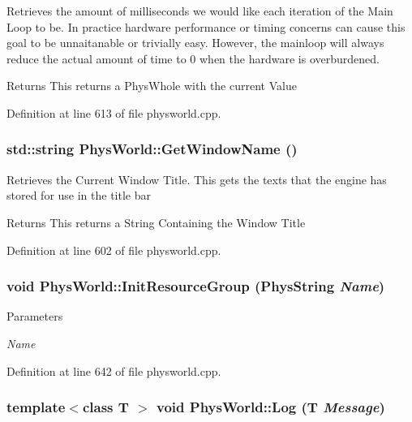 Retrieves the amount of milliseconds we would like each iteration of the Main Loop to be. In practice hardware performance or timing concerns can cause this goal to be unnaitanable or trivially easy. However, the mainloop will always reduce the actual amount of time to 0 when the hardware is overburdened. \begin{DoxyReturn}{Returns}
This returns a PhysWhole with the current Value 
\end{DoxyReturn}


Definition at line 613 of file physworld.cpp.\hypertarget{classPhysWorld_a09163480a549b39a945ee97415eabdc0}{
\subsubsection[{GetWindowName}]{\setlength{\rightskip}{0pt plus 5cm}std::string PhysWorld::GetWindowName ()}}
\label{db/df5/classPhysWorld_a09163480a549b39a945ee97415eabdc0}


Retrieves the Current Window Title. This gets the texts that the engine has stored for use in the title bar \begin{DoxyReturn}{Returns}
This returns a String Containing the Window Title 
\end{DoxyReturn}


Definition at line 602 of file physworld.cpp.\hypertarget{classPhysWorld_a0b67df4c76c32b9b2bdcafdc51f6aba7}{
\subsubsection[{InitResourceGroup}]{\setlength{\rightskip}{0pt plus 5cm}void PhysWorld::InitResourceGroup (PhysString {\em Name})}}
\label{db/df5/classPhysWorld_a0b67df4c76c32b9b2bdcafdc51f6aba7}

\begin{DoxyParams}{Parameters}
\item[{\em Name}]\end{DoxyParams}


Definition at line 642 of file physworld.cpp.\hypertarget{classPhysWorld_a5e9fead1c3100f5dbd5ca985b82b85ea}{
\subsubsection[{Log}]{\setlength{\rightskip}{0pt plus 5cm}template$<$class T $>$ void PhysWorld::Log (T {\em Message})}}
\label{db/df5/classPhysWorld_a5e9fead1c3100f5dbd5ca985b82b85ea}


